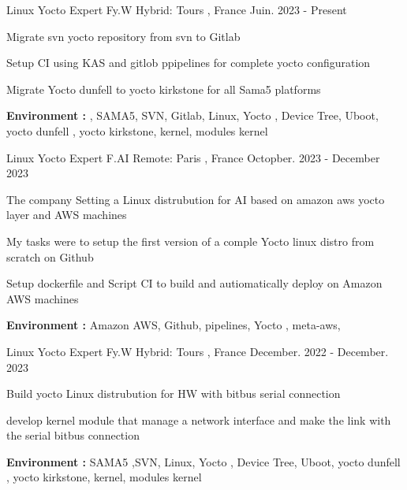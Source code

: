 \documentclass[11pt, a4paper]{awesome-cv} %
\begin{document}
\begin{cventries}


 \cventry
    {Linux Yocto Expert} %
    {Fy.W} %
    {Hybrid:  Tours , France} %
    {Juin. 2023 - Present} %
    { %
        \begin{cvitems}
            \item {Migrate svn yocto repository  from svn to Gitlab }
            \item {Setup CI using KAS and gitlob ppipelines for complete yocto configuration}
            \item {Migrate Yocto dunfell to yocto kirkstone for all Sama5 platforms}
            \item { \textbf{Environment :} ,  SAMA5, SVN, Gitlab, Linux, Yocto , Device Tree, Uboot, yocto dunfell , yocto kirkstone, kernel, modules kernel}
        \end{cvitems}
    }



 \cventry
    {Linux Yocto Expert} %
    {F.AI} %
    {Remote:  Paris , France} %
    {Octopber. 2023 - December 2023} %
    { %
        \begin{cvitems}
            \item {The company Setting a Linux distrubution for AI  based on amazon aws yocto layer and AWS machines }
            \item {My tasks  were to setup the first version of a comple Yocto linux distro  from scratch on Github}
            \item {Setup dockerfile and Script CI to build and autiomatically deploy on Amazon AWS machines }
              \item { \textbf{Environment :} Amazon AWS, Github, pipelines, Yocto , meta-aws, }
        \end{cvitems}
    }

 \cventry
    {Linux Yocto Expert} %
    {Fy.W} %
    {Hybrid:  Tours , France} %
    {December. 2022 - December. 2023} %
    { %
        \begin{cvitems}
            \item {Build yocto Linux distrubution for HW with bitbus serial connection}
            \item {develop kernel module that manage a network interface and make the link with the serial bitbus connection}
            \item { \textbf{Environment :} SAMA5 ,SVN, Linux, Yocto , Device Tree, Uboot, yocto dunfell , yocto kirkstone, kernel, modules kernel}
        \end{cvitems}
    }


\end{cventries}
\end{document}
